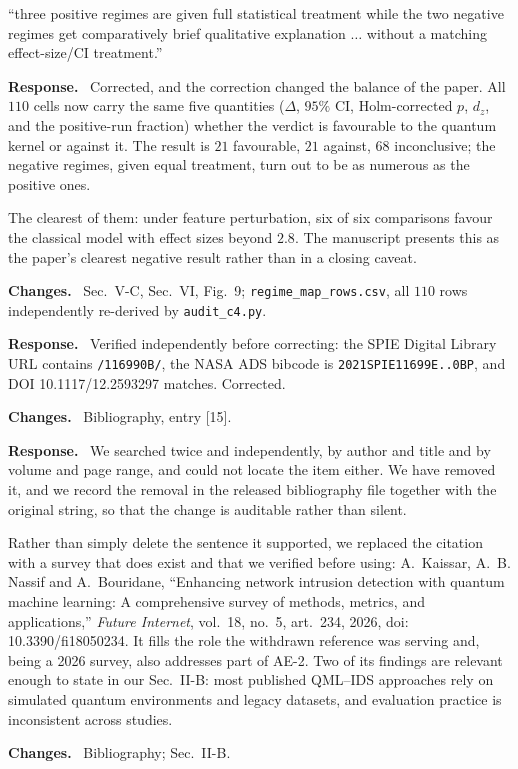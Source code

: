 \documentclass[11pt,a4paper]{article}
\newenvironment{revcomment}
  {\par\addvspace{6pt}\begingroup
   \color{quotegray}\itshape\small
   \begin{list}{}{%
     \setlength{\leftmargin}{1.8em}\setlength{\rightmargin}{1.0em}%
     \setlength{\topsep}{0pt}\setlength{\partopsep}{0pt}%
     \setlength{\parsep}{3pt}\setlength{\itemsep}{0pt}}%
   \item[]}
  {\end{list}\endgroup\normalcolor\addvspace{6pt}}
\newcommand{\itemhead}[2]{%
  \par\addvspace{15pt}%
  \noindent{\bfseries\color{tagink}#1}\hspace{0.7em}{\bfseries #2}%
  \par\addvspace{3.5pt}%
  \noindent{\color{rulegray}\rule{\linewidth}{0.5pt}}%
  \par\addvspace{5pt}%
  \nobreak}
\newcommand{\resp}{\par\addvspace{2pt}\noindent\textbf{Response.}\ }
\newcommand{\changed}{\par\addvspace{5pt}\noindent
  {\bfseries\color{tagink}Changes.}\ }
\begin{document}
\itemhead{R2-4}{Regime map oversells: positive regimes get full statistics,
negative regimes only qualitative treatment}
\begin{revcomment}
``three positive regimes are given full statistical treatment while the two
negative regimes get comparatively brief qualitative explanation $\ldots$
without a matching effect-size/CI treatment.''
\end{revcomment}
\resp
Corrected, and the correction changed the balance of the paper. All $110$ cells
now carry the same five quantities ($\Delta$, $95\%$ CI, Holm-corrected $p$,
$d_z$, and the positive-run fraction) whether the verdict is favourable to
the quantum kernel or against it. The result is $21$ favourable, $21$ against,
$68$ inconclusive; the negative regimes, given equal treatment, turn out to be
as numerous as the positive ones.

The clearest of them: under feature perturbation, six of six comparisons favour
the classical model with effect sizes beyond $2.8$. The manuscript presents this
as the paper's clearest negative result rather than in a closing caveat.
\changed
Sec.~V-C, Sec.~VI, Fig.~9; \texttt{regime\_map\_rows.csv}, all $110$ rows
independently re-derived by \texttt{audit\_c4.py}.

\itemhead{R2-5}{Reference [15]: article number 116990F should be 116990B}
\resp
Verified independently before correcting: the SPIE Digital Library URL contains
\texttt{/116990B/}, the NASA ADS bibcode is \texttt{2021SPIE11699E..0BP}, and
DOI 10.1117/12.2593297 matches. Corrected.
\changed
Bibliography, entry [15].

\itemhead{R2-6}{Reference [26] could not be located; looks fabricated or badly
misattributed}
\resp
We searched twice and independently, by author and title and by volume and
page range, and could not locate the item either. We have removed it, and we
record the removal in the released bibliography file together with the original
string, so that the change is auditable rather than silent.

Rather than simply delete the sentence it supported, we replaced the citation
with a survey that does exist and that we verified before using: A.~Kaissar,
A.~B. Nassif and A.~Bouridane, ``Enhancing network intrusion detection with
quantum machine learning: A comprehensive survey of methods, metrics, and
applications,'' \emph{Future Internet}, vol.~18, no.~5, art.~234, 2026, doi:
10.3390/fi18050234. It fills the role the withdrawn reference was serving and,
being a 2026 survey, also addresses part of AE-2. Two of its findings are
relevant enough to state in our Sec.~II-B: most published QML--IDS approaches
rely on simulated quantum environments and legacy datasets, and evaluation
practice is inconsistent across studies.
\changed
Bibliography; Sec.~II-B.
\end{document}
